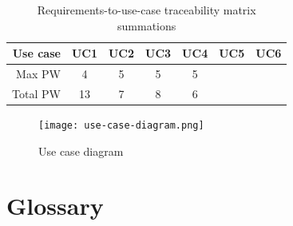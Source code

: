 \documentclass[a4paper]{article}
\begin{document}
	\begin{table}[h!]
		\centering
		\caption{Requirements-to-use-case traceability matrix summations}
		\label{tab:table4}
		\begin{tabular}{r|c|c|c|c|c|c}
			Use case 	& UC1 & UC2 & UC3 & UC4 & UC5 & UC6 \\
			\hline
			Max PW		&  4  &  5  &  5  &  5  &     &    \\
			Total PW	&  13 &  7  &  8  &  6  &     &    \\
		\end{tabular}
	\end{table}
	
	\begin{figure}[h!]
		\caption{Use case diagram}
		\label{figure1}
		\texttt{[image: use-case-diagram.png]}
	\end{figure}

\newpage
\section{Glossary}
\end{document}
